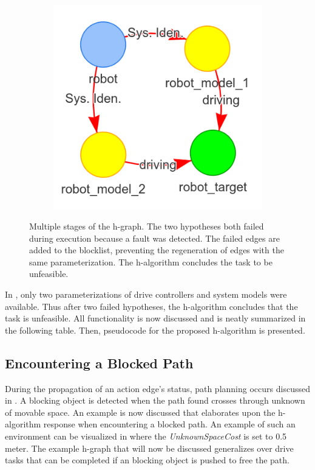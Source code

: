 \begin{figure}[H]
\begin{subfigure}{.3\textwidth}
    \end{subfigure}
    \begin{subfigure}{.3\textwidth}
    \centering
    \includegraphics[width=1\textwidth]{figures/proposed_method/connecting_nodes/failure/fail_7}
    \end{subfigure}
    \hfill
    \caption{Multiple stages of the \ac{h-graph}. The two hypotheses both failed during execution because a fault was detected. The failed edges are added to the blocklist, preventing the regeneration of edges with the same parameterization. The \ac{h-algorithm} concludes the task to be unfeasible.}%
    \label{fig:failure_in_h-graph}
\end{figure}

In , only two parameterizations of drive controllers and system models were available. Thus after two failed hypotheses, the \ac{h-algorithm} concludes that the task is unfeasible. All functionality is now discussed and is neatly summarized in the following table. Then, pseudocode for the proposed \ac{h-algorithm} is presented.\bs

\subsection{Encountering a Blocked Path}%
During the propagation of an action edge's status, path planning occurs discussed in . A blocking object is detected when the path found crosses through unknown of movable space. An example is now discussed that elaborates upon the \ac{h-algorithm} response when encountering a blocked path. An example of such an environment can be visualized in  where the \textit{UnknownSpaceCost} is set to 0.5 meter. The example \ac{h-graph} that will now be discussed generalizes over drive tasks that can be completed if an blocking object is pushed to free the path.\bs

